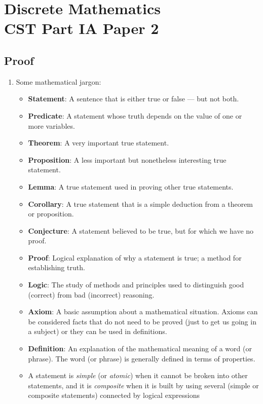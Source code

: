\documentclass{article}
\author{Victor Zhao\\xz398@cam.ac.uk}
\begin{document}
\centering
\section*{Discrete Mathematics\\CST Part IA Paper 2}
\MyAuthor

\justifying
\subsection{Proof}
\begin{enumerate}
    \item Some mathematical jargon:
        \begin{itemize}[label={-},topsep=0pt]
            \item \textbf{Statement}: A sentence that is either true or false — but not both. 
            \item \textbf{Predicate}: A statement whose truth depends on the value of one or more variables.
            \item \textbf{Theorem}: A very important true statement.
            \item \textbf{Proposition}: A less important but nonetheless interesting true statement.
            \item \textbf{Lemma}: A true statement used in proving other true statements.
            \item \textbf{Corollary}: A true statement that is a simple deduction from a theorem or proposition.
            \item \textbf{Conjecture}: A statement believed to be true, but for which we have no proof.
            \item \textbf{Proof}: Logical explanation of why a statement is true; a method for establishing truth.
            \item \textbf{Logic}: The study of methods and principles used to distinguish good (correct) from bad (incorrect) reasoning.
            \item \textbf{Axiom}: A basic assumption about a mathematical situation. Axioms can be considered facts that do not need to be proved (just to get us going in a subject) or they can be used in definitions.
            \item \textbf{Definition}: An explanation of the mathematical meaning of a word (or phrase). The word (or phrase) is generally defined in terms of properties.
            \item A statement is \textit{simple} (or \textit{atomic}) when it cannot be broken into other statements, and it is \textit{composite} when it is built by using several (simple or composite statements) connected by logical expressions

\end{itemize}
\end{enumerate}
\end{document}
